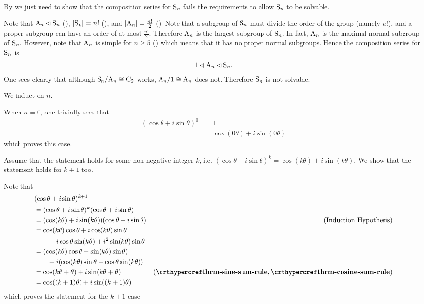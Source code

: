 \begin{questions}
    \item By  we just need to show that the composition series for $\mathrm{S}_{n}$ fails the requirements to allow $\mathrm{S}_{n}$ to be solvable.
    
    Note that $\mathrm{A}_{n} \lhd \mathrm{S}_{n}$ (), $|\mathrm{S}_{n}| = n!$ (), and $|\mathrm{A}_{n}| = \frac{n!}2$ (). Note that a subgroup of $\mathrm{S}_{n}$ must divide the order of the group (namely $n!$), and a proper subgroup can have an order of at most $\frac{n!}2$. Therefore $\mathrm{A}_{n}$ is the largest subgroup of $\mathrm{S}_{n}$. In fact, $\mathrm{A}_{n}$ is the maximal normal subgroup of $\mathrm{S}_{n}$. However, note that $\mathrm{A}_{n}$ is simple for $n \geq 5$ () which means that it has no proper normal subgroups. Hence the composition series for $\mathrm{S}_{n}$ is
    \[
        1 \lhd \mathrm{A}_{n} \lhd \mathrm{S}_{n}.
    \]
    One sees clearly that although $\mathrm{S}_{n}/\mathrm{A}_{n} \cong \mathrm{C}_{2}$ works, $\mathrm{A}_{n}/1 \cong \mathrm{A}_{n}$ does not. Therefore $\mathrm{S}_{n}$ is not solvable.
    
    \item \begin{partquestions}{\roman*}
        \item We induct on $n$.
        
        When $n = 0$, one trivially sees that
        \begin{align*}
            (\cos\theta + i\sin\theta)^0 &= 1\\
            &= \cos(0\theta) + i\sin(0\theta)
        \end{align*}
        which proves this case.

        Assume that the statement holds for some non-negative integer $k$, i.e. $(\cos\theta + i\sin\theta)^k = \cos(k\theta) + i\sin(k\theta)$. We show that the statement holds for $k+1$ too.

        Note that
        \begin{align*}
            &(\cos\theta + i\sin\theta)^{k+1}\\
            &= (\cos\theta + i\sin\theta)^k(\cos\theta + i\sin\theta)\\
            &= (\cos(k\theta) + i\sin(k\theta))(\cos\theta + i\sin\theta) & (\text{Induction Hypothesis})\\
            &= \cos(k\theta)\cos\theta + i\cos(k\theta)\sin\theta\\
            &\quad\quad+ i\cos\theta\sin(k\theta) + i^2\sin(k\theta)\sin\theta\\
            &= (\cos(k\theta)\cos\theta - \sin(k\theta)\sin\theta)\\
            &\quad\quad+ i(\cos(k\theta)\sin\theta + \cos\theta\sin(k\theta))\\
            &= \cos(k\theta+\theta) + i\sin(k\theta+\theta) & (\myref{thrm-sine-sum-rule}, \myref{thrm-cosine-sum-rule})\\
            &= \cos((k+1)\theta) + i\sin((k+1)\theta)
        \end{align*}
        which proves the statement for the $k + 1$ case.
        

\end{partquestions}
\end{questions}
